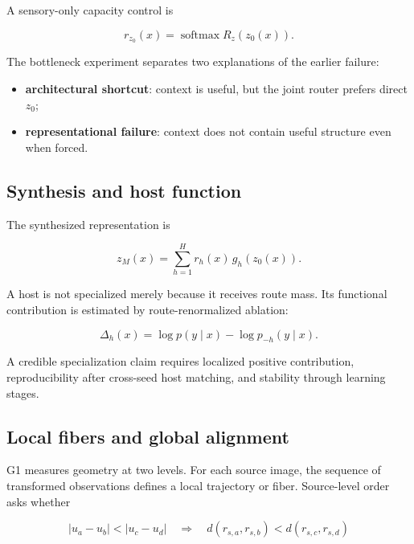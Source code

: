 \documentclass[11pt,a4paper]{article}
\begin{document}
A sensory-only capacity control is

\begin{equation}
 r_{z_0}(x)=\operatorname{softmax}R_z(z_0(x)).
\end{equation}

The bottleneck experiment separates two explanations of the earlier failure:

\begin{itemize}
\item \textbf{architectural shortcut}: context is useful, but the joint router prefers direct $z_0$;
\item \textbf{representational failure}: context does not contain useful structure even when forced.
\end{itemize}

\subsection{Synthesis and host function}

The synthesized representation is

\begin{equation}
 z_M(x)=\sum_{h=1}^{H} r_h(x)\,g_h(z_0(x)).
\end{equation}

A host is not specialized merely because it receives route mass. Its functional contribution is estimated by route-renormalized ablation:

\begin{equation}
 \Delta_h(x)=\log p(y\mid x)-\log p_{-h}(y\mid x).
\end{equation}

A credible specialization claim requires localized positive contribution, reproducibility after cross-seed host matching, and stability through learning stages.

\subsection{Local fibers and global alignment}

G1 measures geometry at two levels. For each source image, the sequence of transformed observations defines a local trajectory or fiber. Source-level order asks whether

\begin{equation}
 |u_a-u_b| < |u_c-u_d|
 \quad\Rightarrow\quad
 d(r_{s,a},r_{s,b}) < d(r_{s,c},r_{s,d})
\end{equation}
\end{document}
